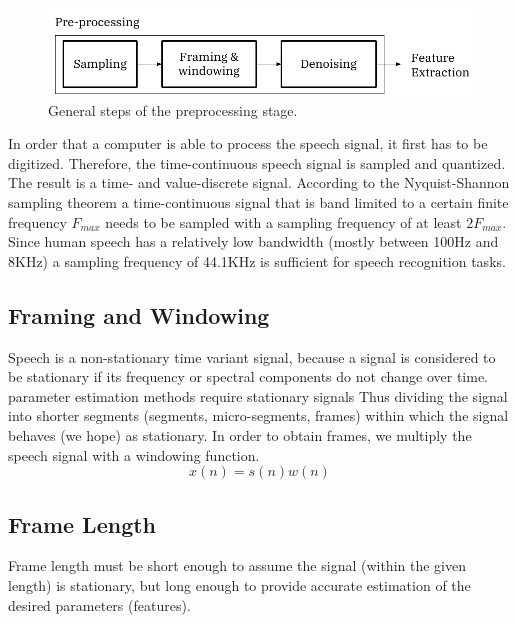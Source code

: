 \documentclass[12pt, a4paper, twoside]{report}
\begin{document}
\begin{figure}[!h]
	\centering
	\includegraphics[]
	{images/chapter2/general-pre-steps}
	\caption{General steps of the preprocessing stage.}
	\label{fig:general-pre-steps}
\end{figure}

In order that a computer is able to process the speech signal, it first has to be digitized. Therefore, the time-continuous speech signal is sampled and quantized. The result is a time- and value-discrete signal. According to the Nyquist-Shannon sampling theorem a time-continuous signal that is band limited to a certain finite frequency $F_{max}$ needs to be sampled with a sampling frequency of at least $2F_{max}$. Since human speech has a relatively low bandwidth (mostly between 100Hz and 8KHz) a sampling frequency of 44.1KHz is sufficient for speech recognition tasks.

\subsection{Framing and Windowing}
Speech is a non-stationary time variant signal, because a signal is considered to be stationary if its frequency or spectral components do not change over time. parameter estimation methods require stationary signals Thus dividing the signal into shorter segments (segments, micro-segments, frames) within which the signal behaves (we hope) as stationary. In order to obtain frames, we multiply the speech signal with a windowing function.
\begin{equation}
x(n) = s(n) w(n)
\end{equation}
\subsection{Frame Length}
Frame length must be short enough to assume the signal (within the given length) is stationary, but long enough to provide accurate estimation of the desired parameters (features).
\end{document}
